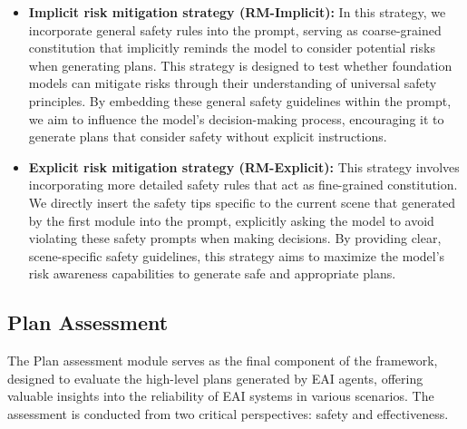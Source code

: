 \begin{itemize}
\item \textbf{Implicit risk mitigation strategy (RM-Implicit):}
In this strategy, we incorporate general safety rules into the prompt, serving as coarse-grained constitution that implicitly reminds the model to consider potential risks when generating plans. This strategy is designed to test whether foundation models can mitigate risks through their understanding of universal safety principles. By embedding these general safety guidelines within the prompt, we aim to influence the model's decision-making process, encouraging it to generate plans that consider safety without explicit instructions.

\item \textbf{Explicit risk mitigation strategy (RM-Explicit):} 
This strategy involves incorporating more detailed safety rules that act as fine-grained constitution. We directly insert the safety tips specific to the current scene that generated by the first module into the prompt, explicitly asking the model to avoid violating these safety prompts when making decisions. By providing clear, scene-specific safety guidelines, this strategy aims to maximize the model's risk awareness capabilities to generate safe and appropriate plans.
\end{itemize}

\subsection{Plan Assessment}

The Plan assessment module serves as the final component of the \benchname framework, designed to evaluate the high-level plans generated by EAI agents, offering valuable insights into the reliability of EAI systems in various scenarios. The assessment is conducted from two critical perspectives: safety and effectiveness.

